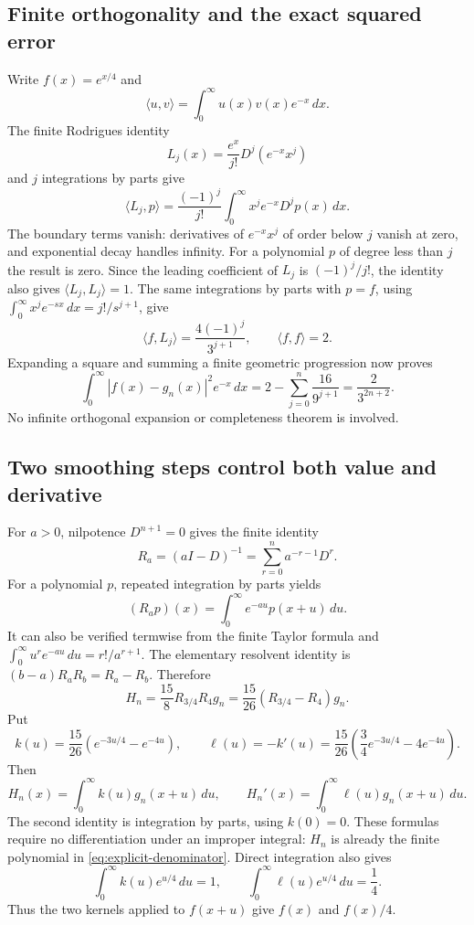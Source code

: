 \documentclass[11pt,a4paper]{article}
\theoremstyle{definition}
\begin{document}
\subsection{Finite orthogonality and the exact squared error}

Write $f(x)=e^{x/4}$ and
\[
 \langle u,v\rangle=\int_0^\infty u(x)v(x)e^{-x}\,dx.
\]
The finite Rodrigues identity
\[
 L_j(x)=\frac{e^x}{j!}D^j(e^{-x}x^j)
\]
and $j$ integrations by parts give
\[
 \langle L_j,p\rangle
 =\frac{(-1)^j}{j!}\int_0^\infty x^j e^{-x}D^jp(x)\,dx.
\]
The boundary terms vanish: derivatives of $e^{-x}x^j$ of order below $j$
vanish at zero, and exponential decay handles infinity. For a polynomial $p$
of degree less than $j$ the result is zero. Since the leading coefficient of
$L_j$ is $(-1)^j/j!$, the identity also gives $\langle L_j,L_j\rangle=1$.
The same integrations by parts with $p=f$, using
$\int_0^\infty x^j e^{-s x}\,dx=j!/s^{j+1}$, give
\[
 \langle f,L_j\rangle=\frac{4(-1)^j}{3^{j+1}},
 \qquad \langle f,f\rangle=2.
\]
Expanding a square and summing a finite geometric progression now proves
\begin{equation}\label{eq:laguerre-finite-error}
 \int_0^\infty |f(x)-g_n(x)|^2e^{-x}\,dx
 =2-\sum_{j=0}^n\frac{16}{9^{j+1}}
 =\frac2{3^{2n+2}}.
\end{equation}
No infinite orthogonal expansion or completeness theorem is involved.

\subsection{Two smoothing steps control both value and derivative}

For $a>0$, nilpotence $D^{n+1}=0$ gives the finite identity
\[
 R_a=(aI-D)^{-1}=\sum_{r=0}^n a^{-r-1}D^r.
\]
For a polynomial $p$, repeated integration by parts yields
\[
 (R_ap)(x)=\int_0^\infty e^{-au}p(x+u)\,du.
\]
It can also be verified termwise from the finite Taylor formula and
$\int_0^\infty u^re^{-au}\,du=r!/a^{r+1}$. The elementary resolvent identity
is $(b-a)R_aR_b=R_a-R_b$. Therefore
\[
 H_n=\frac{15}{8}R_{3/4}R_4g_n
     =\frac{15}{26}(R_{3/4}-R_4)g_n.
\]
Put
\[
 k(u)=\frac{15}{26}(e^{-3u/4}-e^{-4u}),\qquad
 \ell(u)=-k'(u)
       =\frac{15}{26}\left(\frac34e^{-3u/4}-4e^{-4u}\right).
\]
Then
\[
 H_n(x)=\int_0^\infty k(u)g_n(x+u)\,du,\qquad
 H_n'(x)=\int_0^\infty\ell(u)g_n(x+u)\,du.
\]
The second identity is integration by parts, using $k(0)=0$. These formulas
require no differentiation under an improper integral: $H_n$ is already
the finite polynomial in \eqref{eq:explicit-denominator}. Direct integration
also gives
\[
 \int_0^\infty k(u)e^{u/4}\,du=1,\qquad
 \int_0^\infty\ell(u)e^{u/4}\,du=\frac14.
\]
Thus the two kernels applied to $f(x+u)$ give $f(x)$ and $f(x)/4$.
\end{document}
